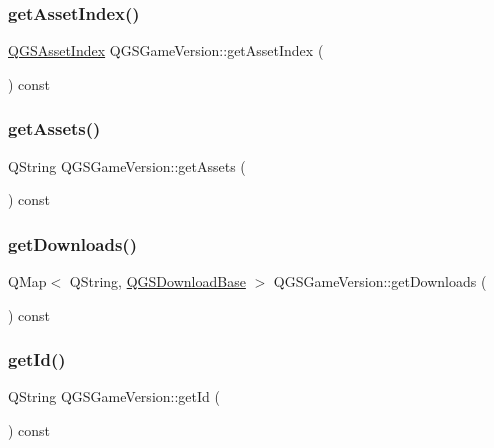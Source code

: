 \subsubsection{\texorpdfstring{get\+Asset\+Index()}{getAssetIndex()}}
{\footnotesize\ttfamily \mbox{\hyperlink{class_q_g_s_asset_index}{Q\+G\+S\+Asset\+Index}} Q\+G\+S\+Game\+Version\+::get\+Asset\+Index (\begin{DoxyParamCaption}{ }\end{DoxyParamCaption}) const}

\mbox{\label{class_q_g_s_game_version_a783ed570087b9ad13709634cc587b1c4}} 
\subsubsection{\texorpdfstring{get\+Assets()}{getAssets()}}
{\footnotesize\ttfamily Q\+String Q\+G\+S\+Game\+Version\+::get\+Assets (\begin{DoxyParamCaption}{ }\end{DoxyParamCaption}) const}

\mbox{\label{class_q_g_s_game_version_a34e01e5caa3cf9fffd5647ce096800ec}} 
\subsubsection{\texorpdfstring{get\+Downloads()}{getDownloads()}}
{\footnotesize\ttfamily Q\+Map$<$ Q\+String, \mbox{\hyperlink{class_q_g_s_download_base}{Q\+G\+S\+Download\+Base}} $>$ Q\+G\+S\+Game\+Version\+::get\+Downloads (\begin{DoxyParamCaption}{ }\end{DoxyParamCaption}) const}

\mbox{\label{class_q_g_s_game_version_a59094a106f76818cd6067062e0f7c60a}} 
\subsubsection{\texorpdfstring{get\+Id()}{getId()}}
{\footnotesize\ttfamily Q\+String Q\+G\+S\+Game\+Version\+::get\+Id (\begin{DoxyParamCaption}{ }\end{DoxyParamCaption}) const}

